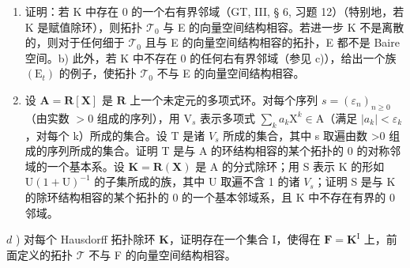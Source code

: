 \begin{enumerate}
\def\labelenumi{\alph{enumi})}
\item
  证明：若 K 中存在 0 的一个右有界邻域（GT, III, § 6, 习题 12）（特别地，若 K 是赋值除环），则拓扑 \(\mathcal{T}_0\) 与 E 的向量空间结构相容。若进一步 K 不是离散的，则对于任何细于 \(\mathcal{T}_0\) 且与 E 的向量空间结构相容的拓扑，E 都不是 Baire 空间。b) 此外，若 K 中不存在 0 的任何右有界邻域（参见 c)），给出一个族 \((\mathrm{E}_t)\) 的例子，使拓扑 \(\mathcal{T}_0\) 不与 E 的向量空间结构相容。
\item
  设 \(\mathbf{A} = \mathbf{R}[\mathbf{X}]\) 是 \(\mathbf{R}\) 上一个未定元的多项式环。对每个序列 \(s = (\varepsilon_n)_{n\geqslant 0}\)（由实数 \(>0\) 组成的序列），用 \(\mathrm{V}_s\) 表示多项式 \(\sum_k a_k\mathrm{X}^k\in \mathrm{A}\)（满足 \(|a_k| < \varepsilon_k\)，对每个 k）所成的集合。设 T 是诸 \(V_{s}\) 所成的集合，其中 s 取遍由数 \textgreater0 组成的序列所成的集合。证明 T 是与 A 的环结构相容的某个拓扑的 0 的对称邻域的一个基本系。设 \(\mathbf{K} = \mathbf{R}(\mathbf{X})\) 是 A 的分式除环；用 S 表示 K 的形如 \(\mathrm{U}(1 + \mathrm{U})^{-1}\) 的子集所成的族，其中 U 取遍不含 1 的诸 \(V_{s}\)；证明 S 是与 K 的除环结构相容的某个拓扑的 0 的一个基本邻域系，且 K 中不存在有界的 0 邻域。
\end{enumerate}

\(d\) ) 对每个 Hausdorff 拓扑除环 \(\mathbf{K}\)，证明存在一个集合 I，使得在 \(\mathbf{F} = \mathbf{K}^{\mathrm{I}}\) 上，前面定义的拓扑 \(\mathcal{T}\) 不与 F 的向量空间结构相容。
